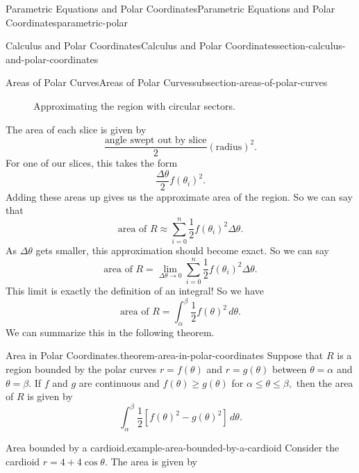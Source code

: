 \documentclass[oneside,10pt,]{book}
\numberwithin{equation}{section}
\begin{document}
\begin{chapterptx}{Parametric Equations and Polar Coordinates}{}{Parametric Equations and Polar Coordinates}{}{}{parametric-polar}
\begin{sectionptx}{Calculus and Polar Coordinates}{}{Calculus and Polar Coordinates}{}{}{section-calculus-and-polar-coordinates}
\begin{subsectionptx}{Areas of Polar Curves}{}{Areas of Polar Curves}{}{}{subsection-areas-of-polar-curves}
\begin{figure}
{
}
\caption{Approximating the region with circular sectors.\label{figure-polar-region-1}}
\end{figure}
\hypertarget{p-1041}{}%
The area of each slice is given by%
%
\begin{equation*}
\frac{\text{angle swept out by slice}}{2}(\text{radius})^{2}.
\end{equation*}
\hypertarget{p-1042}{}%
For one of our slices, this takes the form%
%
\begin{equation*}
\frac{\Delta\theta}{2}f(\theta_{i})^{2}.
\end{equation*}
\hypertarget{p-1043}{}%
Adding these areas up gives us the approximate area of the region. So we can say that%
%
\begin{equation*}
\text{area of }R \approx \sum_{i=0}^{n}\frac{1}{2}f(\theta_{i})^{2}\Delta\theta.
\end{equation*}
\hypertarget{p-1044}{}%
As \(\Delta\theta\) gets smaller, this approximation should become exact. So we can say%
%
\begin{equation*}
\text{area of }R = \lim_{\Delta\theta\to0}\sum_{i=0}^{n}\frac{1}{2}f(\theta_{i})^{2}\Delta\theta.
\end{equation*}
\hypertarget{p-1045}{}%
This limit is exactly the definition of an integral! So we have%
%
\begin{equation*}
\text{area of }R = \int_{\alpha}^{\beta}\frac{1}{2}f(\theta)^{2}\,d\theta.
\end{equation*}
\hypertarget{p-1046}{}%
We can summarize this in the following theorem.%
\begin{theorem}{Area in Polar Coordinates.}{}{theorem-area-in-polar-coordinates}%
\hypertarget{p-1047}{}%
Suppose that \(R\) is a region bounded by the polar curves \(r=f(\theta)\) and \(r=g(\theta)\) between \(\theta = \alpha\) and \(\theta=\beta\). If \(f\) and \(g\) are continuous and \(f(\theta)\geq g(\theta)\) for \(\alpha\leq\theta\leq\beta,\) then the area of \(R\) is given by%
\begin{equation*}
\int_{\alpha}^{\beta}\frac{1}{2}[f(\theta)^{2}-g(\theta)^{2}]\,d\theta.
\end{equation*}
%
\end{theorem}
\begin{example}{Area bounded by a cardioid.}{example-area-bounded-by-a-cardioid}%
\hypertarget{p-1048}{}%
Consider the cardioid\footnotemark{} \(r = 4+4\cos\theta\). The area is given by%

\end{example}
\end{subsectionptx}
\end{sectionptx}
\end{chapterptx}
\end{document}
